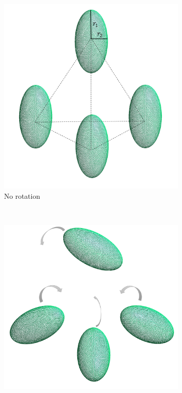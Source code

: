         \begin{figure}[H]
            \begin{subfigure}{\linewidth}
                \centering
                \includegraphics[scale = 0.4]{figures/4_ellip}
                \caption{No rotation}
                \label{No rotation 4}
                \end{subfigure}\\[1ex]
            \begin{subfigure}{.5\linewidth}
            \centering
            \includegraphics[scale = 0.4]{figures/4_ellip_in}

\end{subfigure}
\end{figure}
